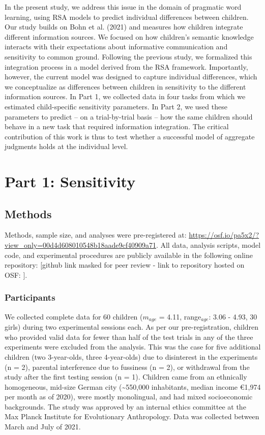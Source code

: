\documentclass[
  man,floatsintext]{apa6}
\begin{document}
In the present study, we address this issue in the domain of pragmatic word learning, using RSA models to predict individual differences between children. Our study builds on Bohn et al. (2021) and measures how children integrate different information sources. We focused on how children's semantic knowledge interacts with their expectations about informative communication and sensitivity to common ground. Following the previous study, we formalized this integration process in a model derived from the RSA framework. Importantly, however, the current model was designed to capture individual differences, which we conceptualize as differences between children in sensitivity to the different information sources. In Part 1, we collected data in four tasks from which we estimated child-specific sensitivity parameters. In Part 2, we used these parameters to predict -- on a trial-by-trial basis -- how the same children should behave in a new task that required information integration. The critical contribution of this work is thus to test whether a successful model of aggregate judgments holds at the individual level.

\hypertarget{part-1-sensitivity}{%
\section{Part 1: Sensitivity}\label{part-1-sensitivity}}

\hypertarget{methods}{%
\subsection{Methods}\label{methods}}

Methods, sample size, and analyses were pre-registered at: \url{https://osf.io/pa5x2/?view_only=00d4d608010548b18aade9cf40909a71}. All data, analysis scripts, model code, and experimental procedures are publicly available in the following online repository: {[}github link masked for peer review - link to repository hosted on OSF: {]}.

\hypertarget{participants}{%
\subsubsection{Participants}\label{participants}}

We collected complete data for 60 children (\(m_{age}\) = 4.11, range\(_{age}\): 3.06 - 4.93, 30 girls) during two experimental sessions each. As per our pre-registration, children who provided valid data for fewer than half of the test trials in any of the three experiments were excluded from the analysis. This was the case for five additional children (two 3-year-olds, three 4-year-olds) due to disinterest in the experiments (n = 2), parental interference due to fussiness (n = 2), or withdrawal from the study after the first testing session (n = 1). Children came from an ethnically homogeneous, mid-size German city (\textasciitilde550,000 inhabitants, median income €1,974 per month as of 2020), were mostly monolingual, and had mixed socioeconomic backgrounds. The study was approved by an internal ethics committee at the Max Planck Institute for Evolutionary Anthropology. Data was collected between March and July of 2021.
\end{document}
